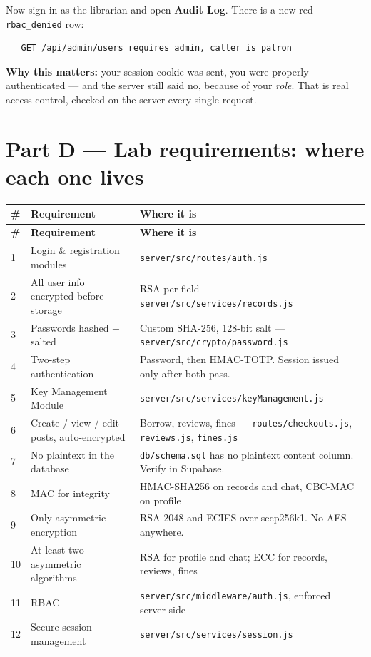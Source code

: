 \documentclass[11pt]{article}
\begin{document}
Now sign in as the librarian and open \textbf{Audit Log}. There is a new red
\texttt{rbac\_denied} row:

\begin{verbatim}
   GET /api/admin/users requires admin, caller is patron
\end{verbatim}

\textbf{Why this matters:} your session cookie was sent, you were properly
authenticated --- and the server still said no, because of your \emph{role}.
That is real access control, checked on the server every single request.

\newpage
\section{Part D --- Lab requirements: where each one lives}

\renewcommand{\arraystretch}{1.3}
\begin{longtable}{@{}p{0.4cm} p{6.2cm} p{8.3cm}@{}}
\toprule
\textbf{\#} & \textbf{Requirement} & \textbf{Where it is} \\
\midrule
\endfirsthead
\toprule
\textbf{\#} & \textbf{Requirement} & \textbf{Where it is} \\
\midrule
\endhead

1 & Login \& registration modules & \texttt{server/src/routes/auth.js} \\
2 & All user info encrypted before storage & RSA per field ---
    \texttt{server/src/services/records.js} \\
3 & Passwords hashed + salted & Custom SHA-256, 128-bit salt ---
    \texttt{server/src/crypto/password.js} \\
4 & Two-step authentication & Password, then HMAC-TOTP. Session issued only
    after both pass. \\
5 & Key Management Module & \texttt{server/src/services/keyManagement.js} \\
6 & Create / view / edit posts, auto-encrypted & Borrow, reviews, fines ---
    \texttt{routes/checkouts.js}, \texttt{reviews.js}, \texttt{fines.js} \\
7 & No plaintext in the database & \texttt{db/schema.sql} has no plaintext
    content column. Verify in Supabase. \\
8 & MAC for integrity & HMAC-SHA256 on records and chat, CBC-MAC on profile \\
9 & Only asymmetric encryption & RSA-2048 and ECIES over secp256k1. No AES
    anywhere. \\
10 & At least two asymmetric algorithms & RSA for profile and chat; ECC for
    records, reviews, fines \\
11 & RBAC & \texttt{server/src/middleware/auth.js}, enforced server-side \\
12 & Secure session management & \texttt{server/src/services/session.js} \\

\bottomrule
\end{longtable}
\end{document}

